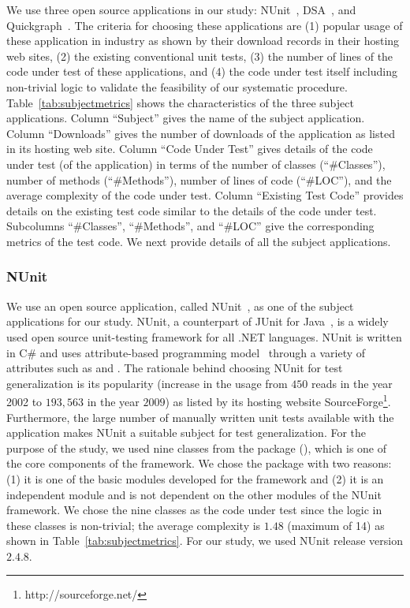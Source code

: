 We use three open source applications in our study: NUnit~\cite{nunit}, DSA~\cite{dsa}, and Quickgraph~\cite{quickgraph}. The criteria for choosing these applications are (1) popular usage of these application in industry as shown by their download records in their hosting web sites, (2) the existing conventional unit tests, (3) the number of lines of the code under test of these applications, and (4) the code under test itself including non-trivial logic to validate the feasibility of our systematic procedure. Table~\ref{tab:subjectmetrics} shows the characteristics of the three subject applications. Column ``Subject'' gives the name of the subject application. Column ``Downloads'' gives the number of downloads of the application as listed in its hosting web site. Column ``Code Under Test'' gives details of the code under test (of the application) in terms of the number of classes (``\#Classes''), number of methods (``\#Methods''), number of lines of code (``\#LOC''), and the average complexity of the code under test. Column ``Existing Test Code'' provides details on the existing test code similar to the details of the code under test. Subcolumns ``\#Classes'', ``\#Methods'', and ``\#LOC'' give the corresponding metrics of the test code. We next provide details of all the subject applications.

\subsubsection{NUnit}
\label{sec:nunit}
We use an open source application, called NUnit~\cite{nunit}, as one of the subject applications for our study. NUnit, a counterpart of JUnit for Java~\cite{JUnit}, is a widely used open source unit-testing framework for all .NET languages. NUnit is written in C\# and uses attribute-based programming model~\cite{TDD} through a variety of attributes such as \CodeIn{[TestFixture]} and \CodeIn{[Test]}. The rationale behind choosing NUnit for test generalization is its popularity  (increase in the usage from $450$ reads in the year 2002 to $193,563$ in the year $2009$) as listed by its hosting website SourceForge\footnote{http://sourceforge.net/}. Furthermore, the large number of manually written unit tests available with the application makes NUnit a suitable subject for test generalization. For the purpose of the study, we used nine classes from the  package (), which is one of the core components of the framework. We chose the  package with two reasons: (1) it is one of the basic modules developed for the framework and (2) it is an independent module and is not dependent on the other modules of the NUnit framework. We chose the nine classes as the code under test since the logic in these classes is non-trivial; the average complexity is $1.48$ (maximum of 14) as shown in Table~\ref{tab:subjectmetrics}. For our study, we used NUnit release version $2.4.8$. 

